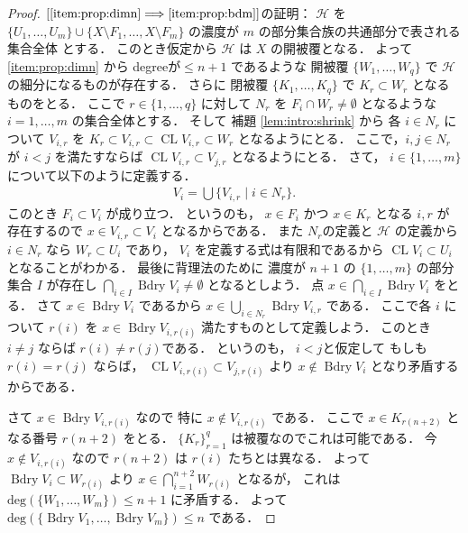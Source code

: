 \documentclass[leqno, a4paper, 12pt]{jsarticle}
\theoremstyle{plain}
\theoremstyle{definition}
\theoremstyle{remark}
\newcommand{\To}{\Longrightarrow}
\DeclareMathOperator{\bd}{\mathrm{Bdry}}
\DeclareMathOperator{\cl}{\mathrm{CL}}
\newcommand{\yodeg}{\mathrm{deg}}
\newcommand{\yocovf}[1]{\mathscr{#1}}
\numberwithin{equation}{section}
\begin{document}
\begin{proof}
$[\ref{item:prop:dimn}\To \ref{item:prop:bdm}]$の証明：
$\yocovf{H}$
を
$\{U_{1}, \dots, U_{m}\}\cup \{X\setminus F_{1}, \dots, X\setminus F_{m}\}$
の濃度が
$m$
の部分集合族の共通部分で表される集合全体
とする．
このとき仮定から
$\yocovf{H}$
は
$X$
の開被覆となる．
よって
\ref{item:prop:dimn}
から
degreeが$\le n+1$
であるような
開被覆
$\{W_{1}, \dots,  W_{q}\}$
で
$\yocovf{H}$
の細分になるものが存在する．
さらに
閉被覆
$\{K_{1}, \dots, K_{q}\}$
で
$K_{r}\subset W_{r}$
となるものをとる．
ここで
$r\in \{1, \dots, q\}$
に対して
$N_{r}$
を
$F_{i}\cap W_{r}\neq \emptyset$
となるような
$i=1, \dots, m$
の集合全体とする．
そして
補題
\ref{lem:intro:shrink}
から
各
$i\in N_{r}$
について
$V_{i, r}$
を
$K_{r}\subset V_{i, r}\subset \cl V_{i, r}\subset W_{r}$
となるようにとる．
ここで，$i, j\in N_{r}$
が
$i<j$
を満たすならば
$\cl V_{i, r}\subset V_{j, r}$
となるようにとる．
さて，
$i\in \{1, \dots, m\}$
について以下のように定義する．
\begin{align}
V_{i}=\bigcup\{V_{i, r}\mid i\in N_{r}\}. 
\end{align}
このとき
$F_{i}\subset V_{i}$
が成り立つ．
というのも，
$x\in F_{i}$
かつ
$x\in K_{r}$
となる
$i, r$
が存在するので
$x\in V_{i, r}\subset V_{i}$
となるからである．
また
$N_{r}$の定義と
$\yocovf{H}$
の定義から
$i\in N_{r}$
なら
$W_{r}\subset U_{i}$
であり，
$V_{i}$
を定義する式は有限和であるから
$\cl V_{i}\subset U_{i}$
となることがわかる．
最後に背理法のために
濃度が
$n+1$
の
$\{1, \dots, m\}$
の部分集合
$I$
が存在し
$\bigcap_{i\in I}\bd V_{i}\neq \emptyset$
となるとしよう．
点
$x\in \bigcap_{i\in I}\bd V_{i}$
をとる．
さて
$x\in \bd V_{i}$
であるから
$x\in \bigcup_{i\in N_{r}}\bd V_{i, r}$
である．
ここで各
$i$
について
$r(i)$
を
$x\in \bd V_{i, r(i)}$
満たすものとして定義しよう．
このとき
$i\ne j$
ならば
$r(i)\neq r(j)$である．
というのも，
$i<j$と仮定して
もしも
$r(i)=r(j)$
ならば，
$\cl V_{i, r(i)}\subset V_{j, r(i)}$
より
$x\not \in \bd V_{i}$
となり矛盾するからである．

さて
$x\in \bd V_{i, r(i)}$
なので
特に
$x\not \in V_{i, r(i)}$
である．
ここで
$x\in K_{r(n+2)}$
となる番号
$r(n+2)$
をとる．
$\{K_{r}\}_{r=1}^{q}$
は被覆なのでこれは可能である．
今
$x\not \in V_{i, r(i)}$
なので
$r(n+2)$
は
$r(i)$
たちとは異なる．
よって
$\bd V_{i}\subset W_{r(i)}$
より
$x\in \bigcap_{i=1}^{n+2}W_{r(i)}$
となるが，
これは
$\yodeg(\{W_{1}, \dots, W_{m}\})\le n+1$
に矛盾する．
よって
$\yodeg(\{\bd V_{1}, \dots,  \bd V_{m}\})\le n$
である．



\end{proof}
\end{document}
